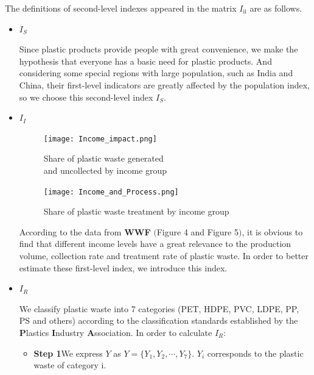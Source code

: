 \documentclass{mcmthesis}
\begin{document}
   The definitions of second-level indexes appeared in the matrix \textbf{$I_{\textrm{ii}}$} are as follows.
   \begin{itemize}
		\item$I_S$
		
			Since plastic products provide people with great convenience, we make the hypothesis that everyone has a basic need for plastic products. And considering some special regions with large population, such as India and China, their first-level indicators are   greatly affected by the population index, so we choose this second-level index $I_S$.
		\item$I_I$ 
	 
		\begin{figure} [H]
			\begin{minipage}[t]{0.5\linewidth} 
			\centering 
			\texttt{[image: Income\_impact.png]} 
			\caption{Share of plastic waste generated\\and uncollected by income group} 
			\label{frame} 
			\end{minipage}%
			\begin{minipage}[t]{0.5\linewidth} 
			\centering 
			\texttt{[image: Income\_and\_Process.png]} 
			\caption{Share of plastic waste treatment by income group} 
			\label{label} 
			\end{minipage} 
		\end{figure}


	   \begin{spacing}{0.5}
	   \hspace*{\fill}
	   \end{spacing}
	   According to the data from \textbf{WWF} $($Figure 4 and Figure 5$)$, it is obvious to find that different income levels have a great relevance to the production volume, collection rate and treatment rate of plastic waste. In order to better estimate these first-level index, we introduce this index.
		 

		\item$I_R$

		We classify plastic waste into 7 categories (PET, HDPE, PVC, LDPE, PP, PS and others) according to the classification standards established by the \textbf{P}lastics \textbf{I}ndustry \textbf{A}ssociation. In order to calculate $I_R$:
	 \begin{itemize}
	   
	   \item \textbf{Step 1}\quad We express $Y$ as $Y=\{ Y_1,Y_2,\cdots,Y_7\}$. $Y_i$ corresponds to the plastic waste of category i.
	   

\end{itemize}
\end{itemize}
\end{document}
